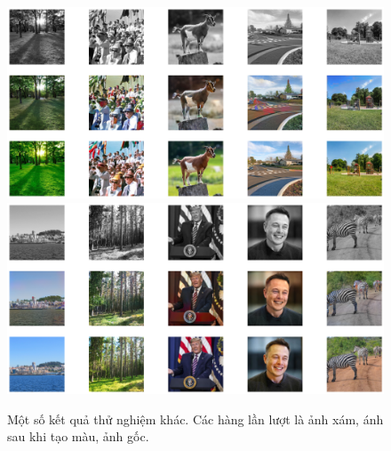 \documentclass[a4paper, 12pt]{report}
\begin{document}
\begin{figure}[!h]
\captionsetup{width=0.8\textwidth}
\centering
\includegraphics[width=15cm]{images/demo1.png}
\includegraphics[width=15cm]{images/demo2.png}
\caption{Một số kết quả thử nghiệm khác. Các hàng lần lượt là ảnh xám, ánh sau khi tạo màu, ảnh gốc.}
\label{fig:moreresults}
\end{figure}
\end{document}
